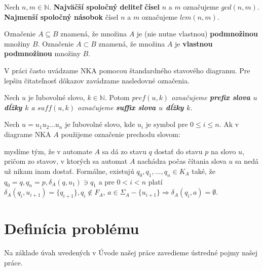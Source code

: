 \begin{notation}
Nech $ n,m \in \mathbb{N} $. \textbf{Najväčší spoločný deliteľ čísel} $ n $ a $ m $ označujeme $ gcd(n,m) $. \textbf{Najmenší spoločný násobok} čísel $ n $ a $ m $ označujeme $ lcm(n,m) $.
\end{notation}

\begin{notation}
Označenie $ A \subseteq B $ znamená, že množina $ A $ je (nie nutne vlastnou) \textbf{podmnožinou} množiny $ B $. Označenie $ A \subset B $ znamená, že množina $ A $ je \textbf{vlastnou podmnožinou} množiny $ B $.
\end{notation}


V práci často uvádzame NKA pomocou štandardného stavového diagramu. Pre lepšiu čitateľnosť dôkazov zavádzame nasledovné označenia.

\begin{notation}
Nech $ u $ je ľubovolné slovo, $ k \in \mathbb{N} $. Potom \em{}$ pref(u,k) $\em{} označujeme \textbf{prefix slova $ u $ dĺžky $ k $} a \em{}$ suff(u,k) $\em{} označujeme \textbf{suffix slova $ u $ dĺžky $ k $}.
\end{notation}

\begin{notation}
Nech $ u = u_1u_2 \ldots u_n$ je ľubovolné slovo, kde $ u_i $ je symbol pre $ 0 \leq i \leq n $. Ak v diagrame NKA $ A $ použijeme označenie prechodu slovom:
\begin{figure}[H]
\centering
{}
\end{figure}

myslíme tým, že v automate $ A $ sa dá zo stavu $ q $ dostať do stavu $ p $ na slovo $ u $, pričom zo stavov, v ktorých sa automat $ A $ nachádza počas čítania slova $ u $ sa nedá už nikam inam dostať. Formálne, existujú $ q_0, q_1, \ldots, q_n \in K_A $ také, že $ q_0 = q, q_n = p, \delta_A(q, u_1) \ni q_1 $ a pre $ 0 < i < n $ platí $ \delta_A(q_i,u_{i+1}) = \lbrace q_{i+1} \rbrace, q_i \notin F_A $, $ a \in \Sigma_A - \lbrace u_{i+1} \rbrace \Rightarrow \delta_A(q_i,a) = \emptyset  $.
\end{notation}

\section{Definícia problému}
Na základe úvah uvedených v Úvode našej práce zavedieme ústredné pojmy našej práce.

